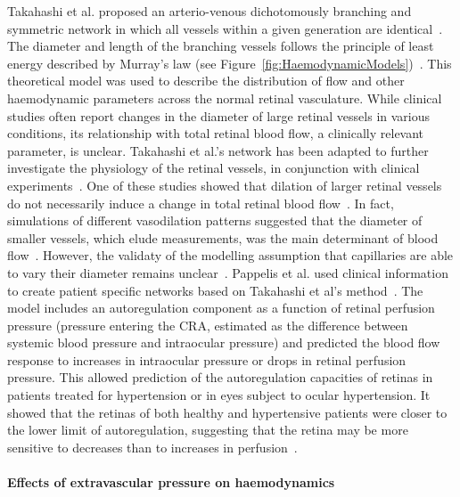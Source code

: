 \documentclass{article}
\begin{document}
Takahashi et al. proposed an arterio-venous dichotomously branching and symmetric network in which all vessels within a given generation are identical~\cite{Takahashi_2009}.
The diameter and length of the branching vessels follows the principle of least energy described by Murray's law (see Figure~\ref{fig:HaemodynamicModels})~\cite{Murray_1926}.
This theoretical model was used to describe the distribution of flow and other haemodynamic parameters across the normal retinal vasculature.
While clinical studies often report changes in the diameter of large retinal vessels in various conditions, its relationship with total retinal blood flow, a clinically relevant parameter, is unclear.
Takahashi et al.'s network has been adapted to further investigate the physiology of the retinal vessels, in conjunction with clinical experiments~\cite{Aschinger_2017,Pappelis_2020}.
One of these studies showed that dilation of larger retinal vessels do not necessarily induce a change in total retinal blood flow~\cite{Aschinger_2017}.
In fact, simulations of different vasodilation patterns suggested that the diameter of smaller vessels, which elude measurements, was the main determinant of blood flow~\cite{Aschinger_2017}.
However, the validaty of the modelling assumption that capillaries are able to vary their diameter remains unclear~\cite{Kur_2012}.
Pappelis et al. used clinical information to create patient specific networks based on Takahashi et al's method~\cite{Pappelis_2020}.
The model includes an autoregulation component as a function of retinal perfusion pressure (pressure entering the CRA, estimated as the difference between systemic blood pressure and intraocular pressure) and predicted the blood flow response to increases in intraocular pressure or drops in retinal perfusion pressure.
This allowed prediction of the autoregulation capacities of retinas in patients treated for hypertension or in eyes subject to ocular hypertension.
It showed that the retinas of both healthy and hypertensive patients were closer to the lower limit of autoregulation, suggesting that the retina may be more sensitive to decreases than to increases in perfusion~\cite{Pappelis_2020}.


\paragraph*{Effects of extravascular pressure on haemodynamics} %
\end{document}
